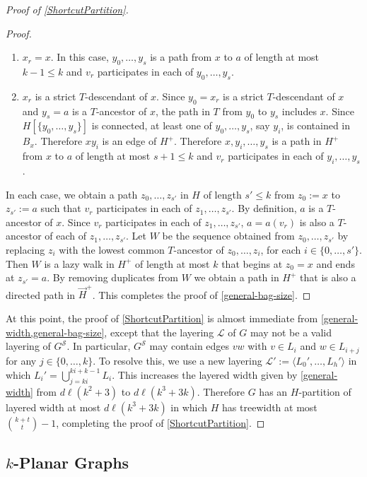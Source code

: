 \documentclass{patmorin}
\theoremstyle{plain}
\theoremstyle{definition}
\renewcommand{\SS}{\mathcal{S}}
\renewcommand{\le}{\leqslant}
\begin{document}
\begin{proof}[Proof of \cref{ShortcutPartition}]
\begin{proof}
\begin{enumerate}
    \item $x_r=x$.  In this case, $y_0,\ldots,y_s$ is a path from $x$ to $a$ of length at most $k-1\le k$ and $v_r$ participates in each of $y_0,\ldots,y_s$.

    \item $x_r$ is a strict $T$-descendant of $x$.
      Since  $y_0=x_r$ is a strict $T$-descendant of $x$ and $y_s=a$ is a $T$-ancestor of $x$, the path in $T$ from $y_0$ to $y_s$ includes $x$.  Since $H[\{y_0,\ldots,y_s\}]$ is connected, at least one of $y_0,\ldots,y_s$, say $y_i$, is contained in $B_x$. Therefore $xy_i$ is an edge of $H^{+}$.  Therefore $x,y_i,\ldots,y_s$ is a path in $H^+$ from $x$ to $a$ of length at most $s+1\le k$ and $v_r$ participates in each of $y_i,\ldots,y_s$.
  \end{enumerate}
  In each case, we obtain a path $z_0,\ldots,z_{s'}$ in $H$ of length $s'\le k$ from $z_0:=x$ to $z_{s'}:=a$ such that $v_r$ participates in each of $z_1,\ldots,z_{s'}$.  By definition, $a$ is a $T$-ancestor of $x$.  Since $v_r$ participates in each of $z_1,\ldots,z_{s'}$, $a=a(v_r)$ is also a $T$-ancestor of each of $z_1,\ldots,z_{s'}$.  Let $W$ be the sequence obtained from $z_0,\ldots,z_{s'}$ by replacing $z_i$ with the lowest common $T$-ancestor of $z_0,\ldots,z_i$, for each $i\in\{0,\ldots,s'\}$.  Then $W$ is a lazy walk in $H^+$ of length at most $k$ that begins at $z_0=x$ and ends at $z_{s'}=a$. By removing duplicates from $W$ we obtain a path in $H^+$ that is also a directed path in $\overrightarrow{H}^+$.  This completes the proof of \cref{general-bag-size}.
\end{proof}

At this point, the proof of \cref{ShortcutPartition} is almost immediate from \cref{general-width,general-bag-size}, except that the layering $\mathcal{L}$ of $G$ may not be a valid layering of $G^{\SS}$.  In particular, $G^{\SS}$ may contain edges $vw$ with $v\in L_i$ and $w\in L_{i+j}$ for any $j\in\{0,\ldots,k\}$.  To resolve this, we use a new layering $\mathcal{L}':=\langle L_0',\ldots,L_h'\rangle$ in which $L_i'=\bigcup_{j=ki}^{ki+k-1} L_i$.  This increases the layered width given by \cref{general-width} from $d\ell(k^2+3)$ to $d\ell(k^3+3k)$.  Therefore $G$ has an $H$-partition of layered width at most $d\ell(k^3+3k)$ in which $H$ has treewidth at most $\binom{k+t}{t}-1$, completing the proof of \cref{ShortcutPartition}.
\end{proof}

\subsection{\boldmath $k$-Planar Graphs}
\label{k_planar_section}
\end{document}
